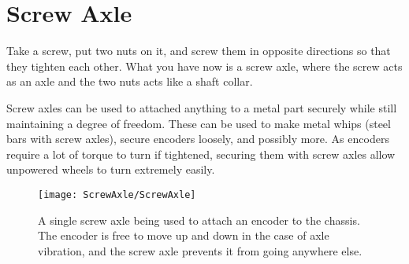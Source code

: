﻿\section{Screw Axle}

Take a screw, put two nuts on it, and screw them in opposite directions so that they tighten each other. What you have now is a screw axle, where the screw acts as an axle and the two nuts acts like a shaft collar.

Screw axles can be used to attached anything to a metal part securely while still maintaining a degree of freedom. These can be used to make metal whips (steel bars with screw axles), secure encoders loosely, and possibly more. As encoders require a lot of torque to turn if tightened, securing them with screw axles allow unpowered wheels to turn extremely easily.

\begin{figure}[h]
    \centering
    \texttt{[image: ScrewAxle/ScrewAxle]}
    \caption{
        A single screw axle being used to attach an encoder to the chassis. The encoder is free to move up and down in the case of axle vibration, and the screw axle prevents it from going anywhere else.
    }
\end{figure}
